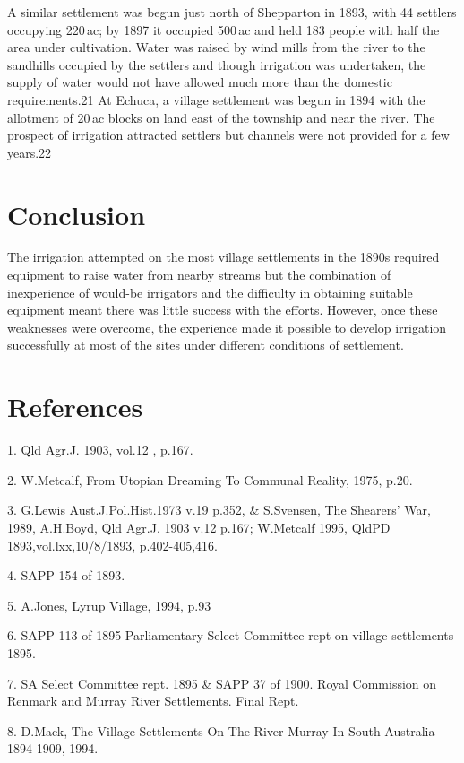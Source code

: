 A similar settlement was begun just north of Shepparton in 1893, with
44 settlers occupying 220\,ac; by 1897 it occupied 500\,ac and held
183 people with half the area under cultivation.  Water was raised by
wind mills from the river to the sandhills occupied by the settlers
and though irrigation was undertaken, the supply of water would not
have allowed much more than the domestic requirements.21 At Echuca, a
village settlement was begun in 1894 with the allotment of 20\,ac
blocks on land east of the township and near the river. The prospect
of irrigation attracted settlers but channels were not provided for a
few years.22

\section{Conclusion}

The irrigation attempted on the most village settlements in the 1890s
required equipment to raise water from nearby streams but the
combination of inexperience of would-be irrigators and the difficulty
in obtaining suitable equipment meant there was little success with
the efforts. However, once these weaknesses were overcome, the
experience made it possible to develop irrigation successfully at most
of the sites under different conditions of settlement.

\section{References}

1.  Qld Agr.J. 1903, vol.12 , p.167.

2.  W.Metcalf, From Utopian Dreaming To Communal Reality, 1975, p.20.

3.  G.Lewis Aust.J.Pol.Hist.1973 v.19 p.352, \& S.Svensen, The 
     Shearers' War, 1989,  A.H.Boyd, Qld Agr.J. 1903 v.12 
    p.167; W.Metcalf 1995, QldPD 1893,vol.lxx,10/8/1893, p.402-405,416.

4.  SAPP 154 of 1893.

5.  A.Jones, Lyrup Village, 1994, p.93

6.  SAPP 113 of 1895  Parliamentary Select Committee rept on village
      settlements 1895.

7.  SA Select Committee  rept. 1895  \& SAPP 37 of 1900. Royal
     Commission  on Renmark and Murray River Settlements. Final Rept.

8. D.Mack, The Village Settlements On The River Murray In South Australia 
    1894-1909, 1994.

